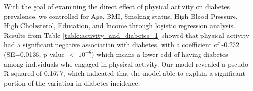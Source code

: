 \documentclass[11pt]{article}
\begin{document}
\begin{table}[h]
\caption{Descriptive statistics of Physical Activity stratified by Diabetes}
\label{table:descriptive_statistics_0}
\begin{threeparttable}
\renewcommand{\TPTminimum}{\linewidth}
\begin{tablenotes}
\footnotesize
\item 
\end{tablenotes}
\end{threeparttable}
\end{table}


With the goal of examining the direct effect of physical activity on diabetes prevalence, we controlled for Age, BMI, Smoking status, High Blood Pressure, High Cholesterol, Education, and Income through logistic regression analysis. Results from Table \ref{table:activity_and_diabetes_1} showed that physical activity had a significant negative association with diabetes, with a coefficient of -0.232 (SE=0.0136, p-value $<$ $10^{-6}$) which means a lower odd of having diabetes among individuals who engaged in physical activity. Our model revealed a pseudo R-squared of 0.1677, which indicated that the model able to explain a significant portion of the variation in diabetes incidence. 
\end{document}

